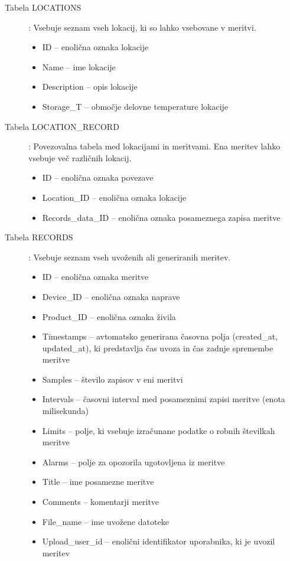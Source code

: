 \documentclass[a4paper, 12pt]{book}
\begin{document}
\begin{description}
\item[Tabela LOCATIONS] : Vsebuje seznam vseh lokacij, ki so lahko vsebovane v meritvi.
	\begin{itemize}
		\item ID – enolična oznaka lokacije
		\item Name – ime lokacije
		\item Description – opis lokacije
		\item Storage\_T – območje delovne temperature lokacije
	\end{itemize}
	
\item[Tabela LOCATION\_RECORD] : Povezovalna tabela med lokacijami in meritvami. Ena meritev lahko vsebuje več različnih lokacij.
	\begin{itemize}
		\item ID – enolična oznaka povezave
		\item Location\_ID – enolična oznaka lokacije
		\item Records\_data\_ID – enolična oznaka posameznega zapisa meritve
	\end{itemize}
	
\item[Tabela RECORDS] : Vsebuje seznam vseh uvoženih ali generiranih meritev.
	\begin{itemize}
		\item ID – enolična oznaka meritve
		\item Device\_ID – enolična oznaka naprave
		\item Product\_ID – enolična oznaka živila
		\item Timestamps – avtomatsko generirana časovna polja (created\_at, updated\_at), ki predstavlja čas uvoza in čas zadnje spremembe meritve
		\item Samples – število zapisov v eni meritvi
		\item Intervals – časovni interval med posameznimi zapisi meritve (enota milisekunda)
		\item Limits – polje, ki vsebuje izračunane podatke o robnih številkah meritve
		\item Alarms – polje za opozorila ugotovljena iz meritve
		\item Title – ime posamezne meritve
		\item Comments – komentarji meritve
		\item File\_name – ime uvožene datoteke
		\item Upload\_user\_id – enolični identifikator uporabnika, ki je uvozil meritev
	\end{itemize}
	

\end{description}
\end{document}
